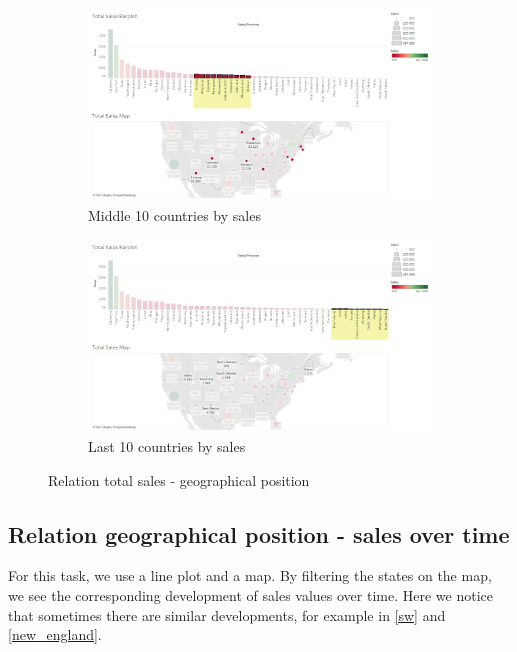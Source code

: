 \documentclass[openany]{article}
\begin{document}
\begin{figure}[h]\ContinuedFloat
\centering
	\begin{subfigure}{\textwidth}
		\centering
		\includegraphics[width=\linewidth]{Tableau/a_3}
		\caption{Middle 10 countries by sales}
	\end{subfigure}

	\begin{subfigure}{\textwidth}
		\centering
		\includegraphics[width=\linewidth]{Tableau/a_1}
		\caption{Last 10 countries by sales}
	\end{subfigure}
	\caption{Relation total sales - geographical position}
\end{figure}

\clearpage
\subsection{Relation geographical position - sales over time}

For this task, we use a line plot and a map.
By filtering the states on the map, we see the corresponding development of sales values over time.
Here we notice that sometimes there are similar developments, for example in \ref {sw} and \ref {new_england}.
\end{document}
